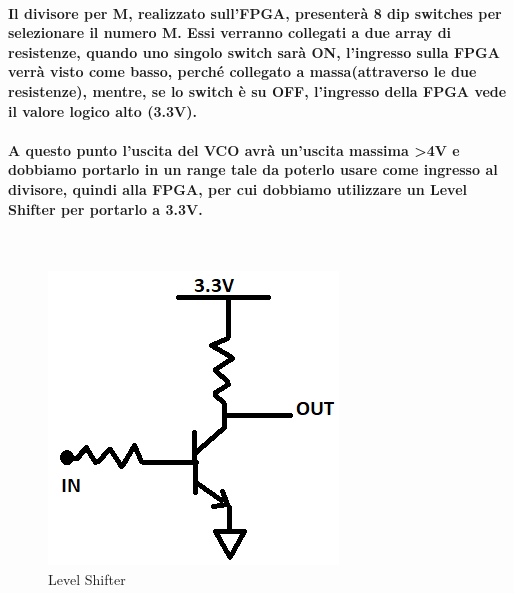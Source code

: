 \documentclass{article}
\begin{document}
\paragraph{Il divisore per M, realizzato sull'FPGA, presenterà 8 dip switches per selezionare il numero M. Essi verranno collegati a due array di resistenze, quando uno singolo switch sarà ON, l'ingresso sulla FPGA verrà visto come basso, perché collegato a massa(attraverso le due resistenze), mentre, se lo switch è su OFF, l'ingresso della FPGA vede il valore logico alto (3.3V).}
\paragraph{A questo punto l'uscita del VCO avrà un'uscita massima \textgreater 4V e dobbiamo portarlo in un range tale da poterlo usare come ingresso al divisore, quindi alla FPGA, per cui dobbiamo utilizzare un Level Shifter per portarlo a 3.3V.}
~\begin{figure}[!h]%
\includegraphics[scale=0.7]{Level.png} 
\centering
\caption{Level Shifter}
\label{fig:foo}
\end{figure}
\end{document}
